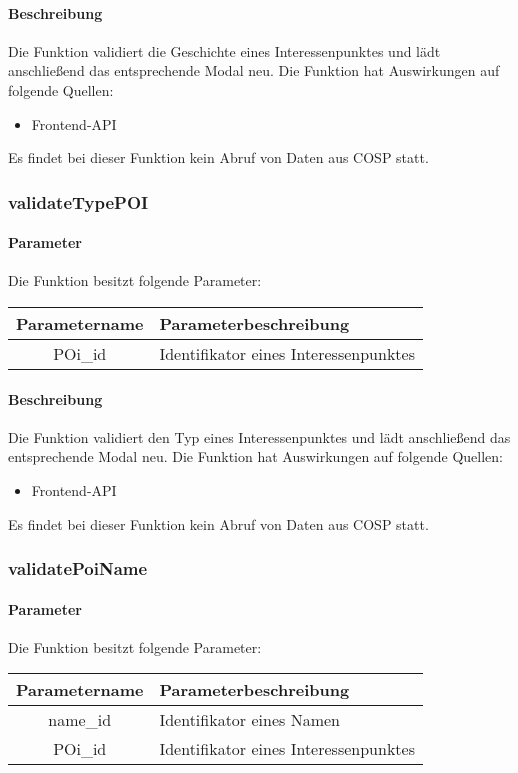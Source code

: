 \paragraph{Beschreibung} Die Funktion validiert die Geschichte eines Interessenpunktes und lädt anschließend das entsprechende Modal neu. Die Funktion hat Auswirkungen auf folgende Quellen:
\begin{itemize}
	\item Frontend-API
\end{itemize}
Es findet bei dieser Funktion kein Abruf von Daten aus {\glqq COSP\grqq} statt.
\subsubsection{validateTypePOI}
\paragraph{Parameter} Die Funktion besitzt folgende Parameter:
\begin{table}[H]
	\begin{tabular}{|c|p{11cm}|}
		\hline
		\textbf{Parametername} & \textbf{Parameterbeschreibung} \\ \hline
		POi\_id & Identifikator eines Interessenpunktes \\ \hline
	\end{tabular}
\end{table}
\paragraph{Beschreibung} Die Funktion validiert den Typ eines Interessenpunktes und lädt anschließend das entsprechende Modal neu. Die Funktion hat Auswirkungen auf folgende Quellen:
\begin{itemize}
	\item Frontend-API
\end{itemize}
Es findet bei dieser Funktion kein Abruf von Daten aus {\glqq COSP\grqq} statt.\\
\subsubsection{validatePoiName}
\paragraph{Parameter} Die Funktion besitzt folgende Parameter:
\begin{table}[H]
	\begin{tabular}{|c|p{11cm}|}
		\hline
		\textbf{Parametername} & \textbf{Parameterbeschreibung} \\ \hline
		name\_id & Identifikator eines Namen \\ \hline
		POi\_id  & Identifikator eines Interessenpunktes \\ \hline
	\end{tabular}
\end{table}

